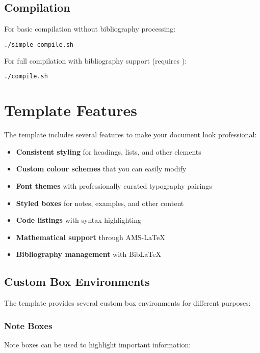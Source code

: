 \documentclass[a4paper,11pt]{article}
\begin{document}
\subsection{Compilation}
\label{sec:compilation}
For basic compilation without bibliography processing:

\begin{lstlisting}[language=bash]
./simple-compile.sh
\end{lstlisting}

For full compilation with bibliography support (requires ):

\begin{lstlisting}[language=bash]
./compile.sh
\end{lstlisting}

\section{Template Features}
The template includes several features to make your document look professional:

\begin{itemize}
    \item \textbf{Consistent styling} for headings, lists, and other elements
    \item \textbf{Custom colour schemes} that you can easily modify
    \item \textbf{Font themes} with professionally curated typography pairings
    \item \textbf{Styled boxes} for notes, examples, and other content
    \item \textbf{Code listings} with syntax highlighting
    \item \textbf{Mathematical support} through AMS-LaTeX
    \item \textbf{Bibliography management} with BibLaTeX
\end{itemize}

\subsection{Custom Box Environments}
The template provides several custom box environments for different purposes:

\subsubsection{Note Boxes}
Note boxes can be used to highlight important information:
\end{document}
